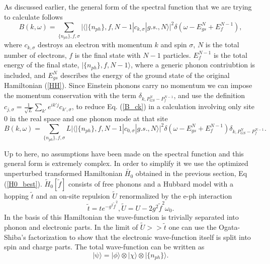 \documentclass[article,11pt]{revtex4}
\begin{document}
As discussed earlier, the general form of the spectral function that we are trying to calculate follows
\begin{equation}
\label{B_ck}
B(k,\omega)=\sum_{\{n_{ph}\},f,\sigma}|\langle |\{n_{ph}\},f,N-1 | c_{k,\sigma} | g.s.,N \rangle |^2 \delta (\omega - E_{gs}^N + E_f ^{N-1} ),
\end{equation}
where $c_{k,\sigma}$ destroys an electron with momentum $k$ and spin $\sigma$, $N$ is the total number of electrons, $f$ is the final state with $N-1$ particles. $E_f ^{N-1}$ is the total energy of the final state, $|\{n_{ph}\},f,N-1\rangle$, where a generic phonon contriubtion is included, and $E_{gs}^N $ describes the energy of the ground state of the original Hamiltonian (\ref{HH}). Since Einstein phonons carry no momentum we can impose the momentum conservation with the term $\delta_{k,P_{GS}^N-P_f^{N-1}}$, and use the definition $c_{j,{\sigma}}=\frac{1}{\sqrt{L}} \sum_{k'} e^{i k' j} c_{k',\sigma}$, to reduce Eq. (\ref{B_ck}) in a calculation involving only site $0$ in the real space and one phonon mode at that site
\begin{equation}
\label{B_c0}
B(k,\omega) = \sum_{\{n_{ph}\},f,\sigma} L |\langle |\{n_{ph}\},f,N-1 | c_{0,\sigma} | g.s.,N \rangle |^2 \delta (\omega - E_{gs}^N + E_f ^{N-1})\delta_{k,P_{GS}^N-P_f^{N-1}} . 
\end{equation}

Up to here, no assumptions have been made on the spectral function and this general form is extremely complex. In order to simplify it we use the optimized unperturbed transformed Hamiltonian $\tilde{H_0}$ obtained in the previous section, Eq (\ref{H0_best}). $\tilde{H}_0 [\tilde{f}]$ consists of free phonons and a Hubbard model with a hopping $\tilde{t}$ and an on-site repulsion $\tilde{U}$ renormalized by the e-ph interaction
\begin{equation}
\label{t_best}
 \tilde{t}=t e^{-g^2 \tilde{f}^2}, \tilde{U}=U-2 g^2 \tilde{f}^2 \omega_0.
\end{equation}
In the basis of this Hamiltonian the wave-function is trivially separated into phonon and electronic parts. In the limit of $\tilde{U} >> \tilde{t}$ one can use the Ogata-Shiba's factorization \cite{Ogata1990} to show that the electronic wave-function itself is split into spin and charge parts. The total wave-function can be written as
\begin{equation}
|\mathrm{\psi}\rangle=|\phi\rangle\otimes |\chi\rangle \otimes |\{n_{ph}\}\rangle.
\label{o_sh}
\end{equation}
\end{document}
